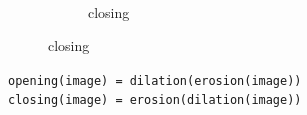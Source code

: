 \documentclass[12pt,a4paper]{article}
\begin{document}
\begin{enumerate}[label=(\alph*)]
\begin{figure}[ht]
\begin{subfigure}{0.45\textwidth}
				\\
				\caption{closing}
				\label{fig:subfig2}
			\end{subfigure}
		\end{figure}
		\newline
		\texttt{opening(image) = dilation(erosion(image))\\ closing(image) = erosion(dilation(image))}


		

\end{enumerate}
\end{document}
